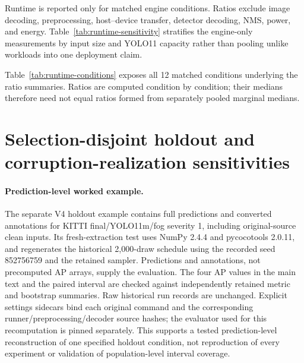 \documentclass[10pt]{article}
\begin{document}
\begin{table}[htbp]
\centering
\caption{Weighting and leave-one-factor-out sensitivity of the 144-cell ledger.}
\label{tab:weighting}
\scriptsize
\resizebox{0.92\textwidth}{!}{}
\end{table}

Runtime is reported only for matched engine conditions. Ratios exclude image
decoding, preprocessing, host--device transfer, detector decoding, NMS, power,
and energy. Table~\ref{tab:runtime-sensitivity} stratifies the engine-only
measurements by input size and YOLO11 capacity rather than pooling unlike
workloads into one deployment claim.

\begin{table}[htbp]
\centering
\caption{Matched engine-only latency-ratio sensitivity. Entries are median
[Q1, Q3] across retained conditions.}
\label{tab:runtime-sensitivity}
\small
\resizebox{0.86\textwidth}{!}{}
\end{table}

Table~\ref{tab:runtime-conditions} exposes all 12 matched conditions underlying
the ratio summaries. Ratios are computed condition by condition; their medians
therefore need not equal ratios formed from separately pooled marginal medians.

\begin{table}[htbp]
\centering
\caption{Condition-level TensorRT engine-only latency and matched ratios for
the primary YOLO11 grid.}
\label{tab:runtime-conditions}
\scriptsize
\resizebox{\textwidth}{!}{}
\end{table}

\FloatBarrier

\section{Selection-disjoint holdout and corruption-realization sensitivities}
\label{sec:holdout-evidence}

\paragraph{Prediction-level worked example.}
The separate V4 holdout example contains full predictions and converted annotations for KITTI final/YOLO11m/fog severity 1, including original-source clean inputs. Its fresh-extraction test uses NumPy 2.4.4 and pycocotools 2.0.11, and regenerates the historical 2,000-draw schedule using the recorded seed 852756759 and the retained sampler. Predictions and annotations, not precomputed AP arrays, supply the evaluation. The four AP values in the main text and the paired interval are checked against independently retained metric and bootstrap summaries. Raw historical run records are unchanged. Explicit settings sidecars bind each original command and the corresponding runner/preprocessing/decoder source hashes; the evaluator used for this recomputation is pinned separately. This supports a tested prediction-level reconstruction of one specified holdout condition, not reproduction of every experiment or validation of population-level interval coverage.
\end{document}
